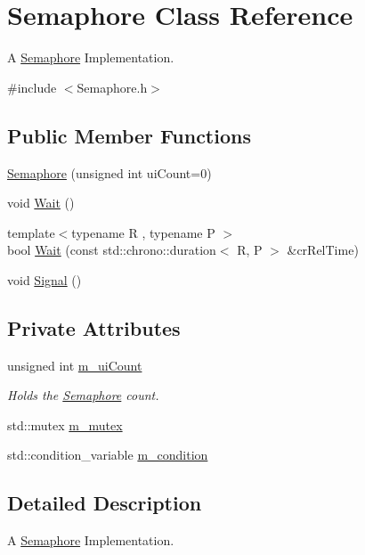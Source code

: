 \hypertarget{classSemaphore}{}\section{Semaphore Class Reference}
\label{classSemaphore}


A \hyperlink{classSemaphore}{Semaphore} Implementation.  




{\ttfamily \#include $<$Semaphore.\+h$>$}

\subsection*{Public Member Functions}
\begin{DoxyCompactItemize}
\item 
\hyperlink{classSemaphore_a0d9290d316636875ca85d1d78950a817}{Semaphore} (unsigned int ui\+Count=0)
\item 
void \hyperlink{classSemaphore_a72aabebf026e3a8b1f3e4d0fa8ee1eda}{Wait} ()
\item 
{\footnotesize template$<$typename R , typename P $>$ }\\bool \hyperlink{classSemaphore_a7f700173ae86ae623684109066e07656}{Wait} (const std\+::chrono\+::duration$<$ R, P $>$ \&cr\+Rel\+Time)
\item 
void \hyperlink{classSemaphore_a86f92f738b4486439b296d8e235895f2}{Signal} ()
\end{DoxyCompactItemize}
\subsection*{Private Attributes}
\begin{DoxyCompactItemize}
\item 
unsigned int \hyperlink{classSemaphore_a1456f105008b0c309f41211afbdd5fee}{m\+\_\+ui\+Count}
\begin{DoxyCompactList}\small\item\em Holds the \hyperlink{classSemaphore}{Semaphore} count. \end{DoxyCompactList}\item 
std\+::mutex \hyperlink{classSemaphore_a6490f302f311da3ce373a81672673296}{m\+\_\+mutex}
\item 
std\+::condition\+\_\+variable \hyperlink{classSemaphore_a2b04d3a53f1fc1a13d7ed5d19d9e2be9}{m\+\_\+condition}
\end{DoxyCompactItemize}


\subsection{Detailed Description}
A \hyperlink{classSemaphore}{Semaphore} Implementation. 

